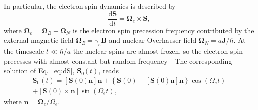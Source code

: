 \documentclass[prl,nobibnotes,twocolumn,aps,longbibliography,superscriptaddress,notoc]{revtex4-1}
\renewcommand{\d}{\mathrm d}
\begin{document}
In particular, the electron spin dynamics is described by
\begin{equation}
  \label{eq:dS}
  \frac{\d\bm S}{\d t}=\bm\Omega_e\times\bm S,
\end{equation}
where $\bm\Omega_e=\bm\Omega_B+\bm\Omega_N$ is the electron spin precession frequency contributed by the external magnetic field $\bm\Omega_B=\gamma_e\bm B$ and nuclear Overhauser field $\bm\Omega_N=a\bm J/\hbar$. At the timescale $t\ll\hbar/a$ the nuclear spins are almost frozen, so the electron spin precesses with almost constant but random frequency~\cite{S_merkulov02}. The corresponding solution of Eq.~\eqref{eq:dS}, $\bm S_0(t)$, reads
\begin{multline}
  \label{eq:S0}
  \bm S_0(t)=\left[\bm S(0)\bm n\right]\bm n+\left\{\bm S(0)-\left[\bm S(0)\bm n\right]\bm n\right\}\cos\left(\Omega_e t\right)\\
  +\left[\bm S(0)\times\bm n\right]\sin\left(\Omega_e t\right),
\end{multline}
where $\bm n=\bm\Omega_e/\Omega_e$.
\end{document}
